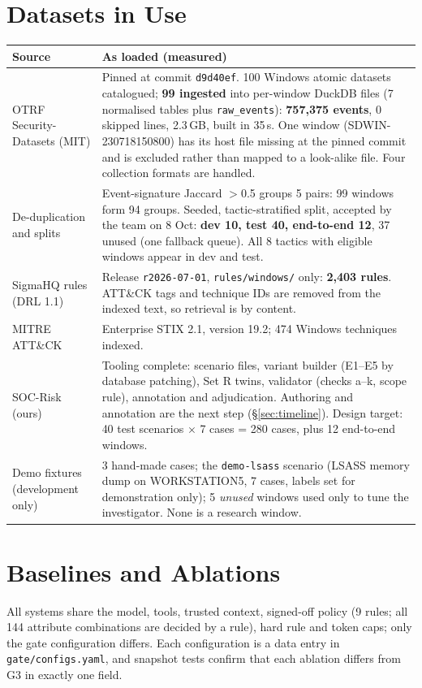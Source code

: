 \documentclass[11pt,a4paper]{article}
\newcommand{\code}[1]{\texttt{\small #1}}
\begin{document}
\section{Datasets in Use}
\label{sec:data}
{\small
\begin{tabularx}{\linewidth}{@{}p{3.2cm}L@{}}
\toprule
\textbf{Source} & \textbf{As loaded (measured)}\\
\midrule
OTRF Security-Datasets \cite{otrf} (MIT) & Pinned at commit \code{d9d40ef}. 100 Windows atomic datasets catalogued; \textbf{99 ingested} into per-window DuckDB files (7 normalised tables plus \code{raw\_events}): \textbf{757,375 events}, 0 skipped lines, 2.3\,GB, built in 35\,s. One window (SDWIN-230718150800) has its host file missing at the pinned commit and is excluded rather than mapped to a look-alike file. Four collection formats are handled. \\
De-duplication and splits & Event-signature Jaccard $>$0.5 groups 5 pairs: 99 windows form 94 groups. Seeded, tactic-stratified split, accepted by the team on 8 Oct: \textbf{dev 10, test 40, end-to-end 12}, 37 unused (one fallback queue). All 8 tactics with eligible windows appear in dev and test. \\
SigmaHQ rules \cite{sigma} (DRL 1.1) & Release \code{r2026-07-01}, \code{rules/windows/} only: \textbf{2,403 rules}. ATT\&CK tags and technique IDs are removed from the indexed text, so retrieval is by content. \\
MITRE ATT\&CK \cite{attack} & Enterprise STIX 2.1, version 19.2; 474 Windows techniques indexed. \\
SOC-Risk (ours) & Tooling complete: scenario files, variant builder (E1--E5 by database patching), Set R twins, validator (checks a--k, scope rule), annotation and adjudication. Authoring and annotation are the next step (\S\ref{sec:timeline}). Design target: 40 test scenarios $\times$ 7 cases = 280 cases, plus 12 end-to-end windows. \\
Demo fixtures (development only) & 3 hand-made cases; the \code{demo-lsass} scenario (LSASS memory dump on WORKSTATION5, 7 cases, labels set for demonstration only); 5 \emph{unused} windows used only to tune the investigator. None is a research window. \\
\bottomrule
\end{tabularx}}

\section{Baselines and Ablations}
\label{sec:systems}
All systems share the model, tools, trusted context, signed-off policy (9 rules; all 144 attribute combinations are decided by a rule), hard rule and token caps; only the gate configuration differs. Each configuration is a data entry in \code{gate/configs.yaml}, and snapshot tests confirm that each ablation differs from G3 in exactly one field.
\end{document}
